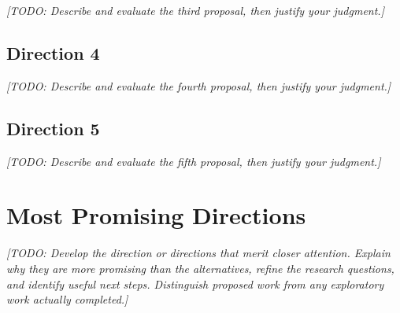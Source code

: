 \documentclass[11pt,letterpaper]{article}
\newcommand{\placeholder}[1]{\textit{[TODO: #1]}}
\begin{document}
\placeholder{Describe and evaluate the third proposal, then justify your judgment.}

\subsection{Direction 4}

\placeholder{Describe and evaluate the fourth proposal, then justify your judgment.}

\subsection{Direction 5}

\placeholder{Describe and evaluate the fifth proposal, then justify your judgment.}


\section{Most Promising Directions}
\label{sec:promising}

\placeholder{Develop the direction or directions that merit closer attention.
Explain why they are more promising than the alternatives, refine the research
questions, and identify useful next steps. Distinguish proposed work from any
exploratory work actually completed.}


\end{document}
